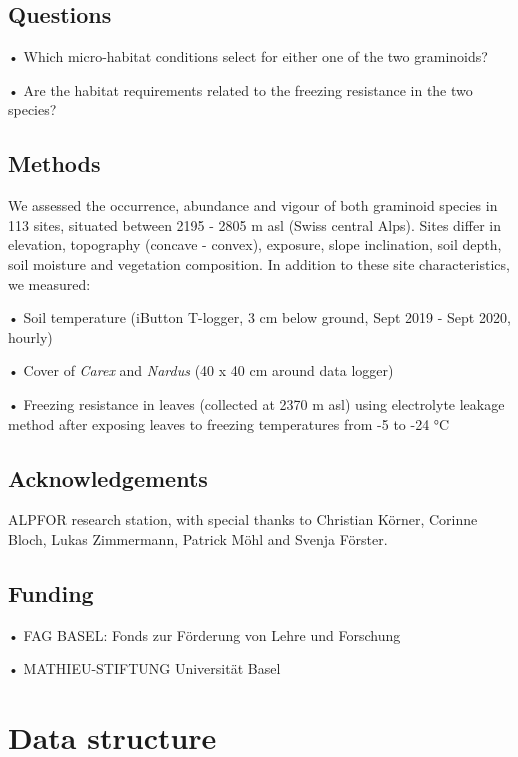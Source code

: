 \documentclass[
]{book}
\begin{document}
\hypertarget{questions}{%
\section{Questions}\label{questions}}

• Which micro-habitat conditions select for either one of the two graminoids?

• Are the habitat requirements related to the freezing resistance in the two species?

\hypertarget{methods}{%
\section{Methods}\label{methods}}

We assessed the occurrence, abundance and vigour of both graminoid species in 113 sites, situated between 2195 - 2805 m asl (Swiss central Alps). Sites differ in elevation, topography (concave - convex), exposure, slope inclination, soil depth, soil moisture and vegetation composition. In addition to these site characteristics, we measured:

• Soil temperature (iButton T-logger, 3 cm below ground, Sept 2019 - Sept 2020, hourly)

• Cover of \emph{Carex} and \emph{Nardus} (40 x 40 cm around data logger)

• Freezing resistance in leaves (collected at 2370 m asl) using electrolyte leakage
method after exposing leaves to freezing temperatures from -5 to -24 °C

\hypertarget{acknowledgements}{%
\section{Acknowledgements}\label{acknowledgements}}

ALPFOR research station, with special thanks to Christian Körner, Corinne Bloch, Lukas Zimmermann, Patrick Möhl and Svenja Förster.

\hypertarget{funding}{%
\section{Funding}\label{funding}}

• FAG BASEL: Fonds zur Förderung von Lehre und Forschung

• MATHIEU-STIFTUNG Universität Basel

\hypertarget{data-structure}{%
\chapter{Data structure}\label{data-structure}}
\end{document}

